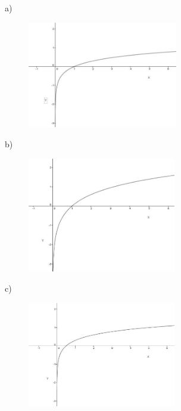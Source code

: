 \begin{respostas}{7}
\begin{multicols}{2}
    \ansitem{}

a)\begin{figure}[H]
    \begin{Center}
        \includegraphics[width=2.58in,height=1.83in]{capitulos/logaritmos_e_funcao_logaritmica/media/image19.jpeg}
    \end{Center}
\end{figure}

b)\begin{figure}[H]
    \begin{Center}
        \includegraphics[width=2.55in,height=1.98in]{capitulos/logaritmos_e_funcao_logaritmica/media/image20.jpeg}
    \end{Center}
\end{figure}

c)\begin{figure}[H]
    \begin{Center}
        \includegraphics[width=2.56in,height=1.81in]{capitulos/logaritmos_e_funcao_logaritmica/media/image21.jpeg}
    \end{Center}
\end{figure}


\end{multicols}
\end{respostas}
